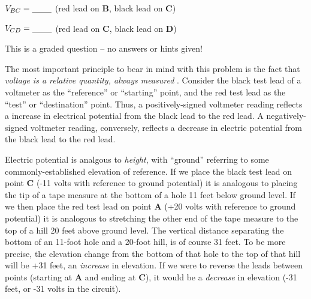 $V_{BC} = \hbox{\underbar{ \hskip 20pt}}$ (red lead on {\bf B}, black lead on {\bf C})

\vskip 5pt

$V_{CD} = \hbox{\underbar{ \hskip 20pt}}$ (red lead on {\bf C}, black lead on {\bf D})

\vfil 

\eject






This is a graded question -- no answers or hints given!







The most important principle to bear in mind with this problem is the fact that {\it voltage is a relative quantity, always measured }.  Consider the black test lead of a voltmeter as the ``reference'' or ``starting'' point, and the red test lead as the ``test'' or ``destination'' point.  Thus, a positively-signed voltmeter reading reflects a increase in electrical potential from the black lead to the red lead.  A negatively-signed voltmeter reading, conversely, reflects a decrease in electric potential from the black lead to the red lead.

\vskip 10pt

Electric potential is analgous to {\it height}, with ``ground'' referring to some commonly-established elevation of reference.  If we place the black test lead on point {\bf C} (-11 volts with reference to ground potential) it is analogous to placing the tip of a tape measure at the bottom of a hole 11 feet below ground level.  If we then place the red test lead on point {\bf A} (+20 volts with reference to ground potential) it is analogous to stretching the other end of the tape measure to the top of a hill 20 feet above ground level.  The vertical distance separating the bottom of an 11-foot hole and a 20-foot hill, is of course 31 feet.  To be more precise, the elevation change from the bottom of that hole to the top of that hill will be +31 feet, an {\it increase} in elevation.  If we were to reverse the leads between points (starting at {\bf A} and ending at {\bf C}), it would be a {\it decrease} in elevation (-31 feet, or -31 volts in the circuit).

\vskip 10pt

